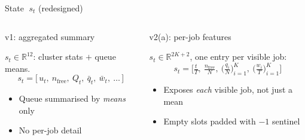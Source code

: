 \begin{frame}{State $\;s_t$ \hfill \small\textcolor{SoftCoral}{(redesigned)}}
  \footnotesize
  \begin{columns}[T,onlytextwidth]
      \begin{block}{v1: aggregated summary}
        \begin{minipage}[t][4.0cm]{\linewidth}
        \begin{minipage}[t][2.0cm]{\linewidth}
        $s_t \in \mathbb{R}^{12}$: cluster stats $+$ queue means.
        $$
          s_t = \big[\,u_t,\ n_{\text{free}},\ Q_t,\ \bar{q}_t,\ \bar{w}_t,\ \dots\,\big]
        $$
        \end{minipage}
        \begin{itemize}\setlength\itemsep{3pt}
          \item Queue summarised by \emph{means} only
          \item No per-job detail
        \end{itemize}
        \end{minipage}
      \end{block}

    \hfill
      \begin{block}{v2(a): per-job features}
        \begin{minipage}[t][4.0cm]{\linewidth}
        \begin{minipage}[t][2.0cm]{\linewidth}
        $s_t \in \mathbb{R}^{2K+2}$, one entry per visible job:
        $$
          s_t = \Big[\tfrac{t}{T},\ \tfrac{n_{\text{free}}}{N},\
          \big(\tfrac{q_i}{N}\big)_{i=1}^{K},\
          \big(\tfrac{w_i}{T}\big)_{i=1}^{K}\Big]
        $$
        \end{minipage}
        \begin{itemize}\setlength\itemsep{3pt}
          \item Exposes \emph{each} visible job, not just a mean
          \item Empty slots padded with $-1$ sentinel
        \end{itemize}
        \end{minipage}
      \end{block}


\end{columns}
\end{frame}
